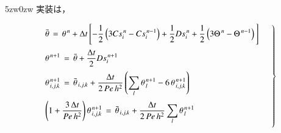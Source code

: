 \begin{indentation}{5zw}{0zw}
\noindent 実装は，

\begin{equation}
\left.
\begin{array}{l}
\vspace{2mm}
\displaystyle{ \bar{\theta} \,=\, \theta^{\,n} + \Delta t \left[ - \frac{1}{2} \left( 3 Cs_i^{\,n} - Cs_i^{\,n-1} \right) + 
\frac{1}{2} Ds_i^{\,n} + \frac{1}{2} \left( 3\Theta^{\,n} -\Theta^{\,n-1} \right) \, \right] } \\
\vspace{2mm}
\displaystyle{ \theta^{\,n+1} \,=\, \bar{\theta} + \frac{\Delta t}{2} Ds_i^{\,n+1} } \\
\vspace{2mm}
\displaystyle{ \theta_{\,i,j,k}^{\,n+1} \,=\, \bar{\theta}_{\,i,j,k} + \frac{\Delta t}{2\,Pe\,h^2} \left( \sum \limits_l {\theta_{\,l}^{\,n+1}} - 6\,\theta_{\,i,j,k}^{\,n+1} \right) } \\
\vspace{2mm}
\displaystyle{ \left( 1 + \frac{3\,\Delta t}{Pe\,h^2} \right) \theta_{\,i,j,k}^{\,n+1} \,=\, \bar{\theta}_{\,i,j,k} + \frac{\Delta t}{2\,Pe\,h^2} \sum \limits_l {\theta_{\,l}^{\,n+1}} } \\
\end{array} \quad \right\}
\label{eq:CN iteration ABCN thermal}
\end{equation}

\end{indentation}

%
